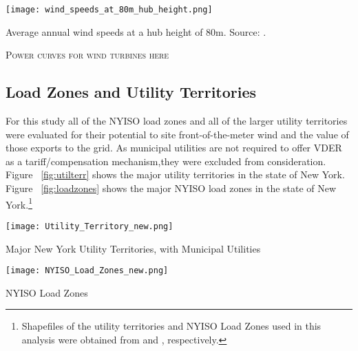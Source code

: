 \begin{conditionalfigure}[!htb]
  \centering
	  \texttt{[image: wind\_speeds\_at\_80m\_hub\_height.png]}
	  \caption{Average annual wind speeds at a hub height of 80m. Source: \citet{awst_3_2012}.}
	  \label{fig:windspeeds}
\end{conditionalfigure}

\vspace*{10mm}
\centerline{\large\textsc{Power curves for wind turbines here}}
\vspace*{10mm}


\subsection{Load Zones and Utility Territories}
\label{meth_loc}
For this study all of the NYISO load zones and all of the larger utility territories were evaluated for their potential to site front-of-the-meter wind and the value of those exports to the grid. As municipal utilities are not required to offer VDER as a tariff/compensation mechanism,they were excluded from consideration. Figure ~\ref{fig:utilterr} shows the major utility territories in the state of New York. Figure ~\ref{fig:loadzones} shows the major NYISO load zones in the state of New York.\footnote{Shapefiles of the utility territories and NYISO Load Zones used in this analysis were obtained from \cite{government_of_new_york_nys_2020} and \cite{new_york_power_authority_nyiso_2014}, respectively.}



\begin{conditionalfigure}[!htb]
  \centering
	  \texttt{[image: Utility\_Territory\_new.png]}
	  \caption{Major New York Utility Territories, with Municipal Utilities}
	  \label{fig:utilterr}
\end{conditionalfigure}

\begin{conditionalfigure}[!htb]
  \centering
	  \texttt{[image: NYISO\_Load\_Zones\_new.png]}
	  \caption{NYISO Load Zones}
	  \label{fig:loadzones}
\end{conditionalfigure}


